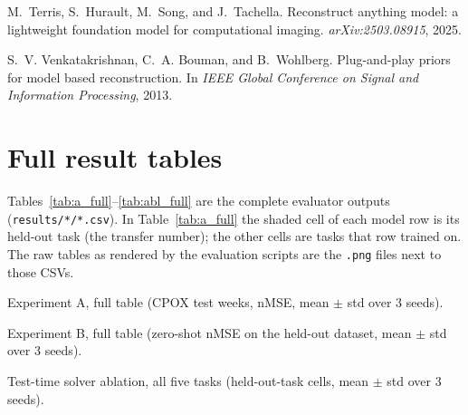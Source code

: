 \documentclass{article}
\begin{document}
\begin{thebibliography}{15}
M.~Terris, S.~Hurault, M.~Song, and J.~Tachella.
\newblock Reconstruct anything model: a lightweight foundation model for computational imaging.
\newblock \emph{arXiv:2503.08915}, 2025.

S.~V. Venkatakrishnan, C.~A. Bouman, and B.~Wohlberg.
\newblock Plug-and-play priors for model based reconstruction.
\newblock In \emph{IEEE Global Conference on Signal and Information Processing}, 2013.

\end{thebibliography}

\clearpage
\appendix
\section{Full result tables}
\label{app:full}
Tables~\ref{tab:a_full}--\ref{tab:abl_full} are the complete evaluator outputs (\texttt{results/*/*.csv}).
In Table~\ref{tab:a_full} the shaded cell of each model row is its held-out task (the transfer number); the
other cells are tasks that row trained on. The raw tables as rendered by the evaluation scripts are the
\texttt{.png} files next to those CSVs.

\begin{table}[h]
\centering\scriptsize

\caption{Experiment A, full table (CPOX test weeks, nMSE, mean $\pm$ std over 3 seeds).}
\label{tab:a_full}
\end{table}

\begin{table}[h]
\centering\scriptsize\setlength{\tabcolsep}{2pt}

\caption{Experiment B, full table (zero-shot nMSE on the held-out dataset, mean $\pm$ std over 3 seeds).}
\label{tab:b_full}
\end{table}

\begin{table}[h]
\centering\scriptsize\setlength{\tabcolsep}{3pt}

\caption{Test-time solver ablation, all five tasks (held-out-task cells, mean $\pm$ std over 3 seeds).}
\label{tab:abl_full}
\end{table}
\end{document}
